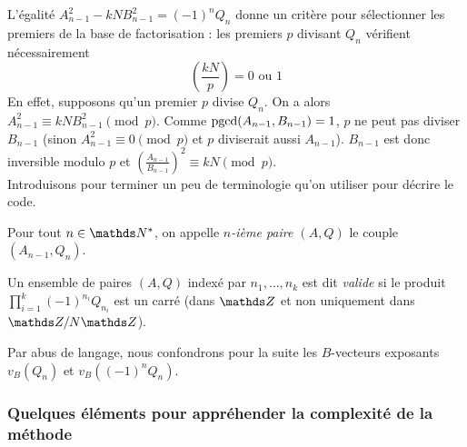 L'égalité $A_{n-1}^2 - kNB_{n-1}^2 = (-1)^n Q_n$ donne un critère pour
sélectionner les premiers de la base de factorisation : les premiers $p$
divisant $Q_n$ vérifient nécessairement \[ \left(\frac{kN}{p} \right) = 0 
\text{ ou } 1 \] En effet, supposons qu'un premier $p$ divise $Q_n$. 
On a alors $ A_{n-1}^2 \equiv kNB_{n-1}^2 \pmod{p}$. Comme
$\operatorname{pgcd}(A_{n-1},B_{n-1}) = 1$, $p$ ne peut pas diviser $B_{n-1}$ (sinon
$A_{n-1}^2 \equiv 0 \pmod{p}$ et $p$ diviserait aussi $A_{n-1}$). $B_{n-1}$ 
est donc inversible modulo $p$ et $\left( \frac{A_{n-1}}{B_{n-1}}\right )^2 
\equiv kN \pmod{p}$.\\ 

Introduisons pour terminer un peu de terminologie qu'on utiliser pour décrire
le code. 

\begin{definition}
	Pour tout $n\in \N^*$, on appelle \emph{$n$-ième paire $(A, Q)$} le couple
	$(A_{n-1}, Q_n)$.
\end{definition}

\begin{definition}
	Un ensemble de paires $(A, Q)$ indexé par $n_1, \dots, n_k$ est dit
	\emph{valide} si le produit $\prod_{i=1}^k (-1)^{n_i} Q_{n_i}$ est un carré
	(dans $\Z$ et non uniquement dans $\Z/N\Z$).
\end{definition}

\begin{remarque}
	Par abus de langage, nous confondrons pour la suite les $B$-vecteurs exposants
	$v_B(Q_n)$ et $v_B((-1)^n Q_n)$.
\end{remarque}

\subsubsection{Quelques éléments pour appréhender la complexité de la méthode}

